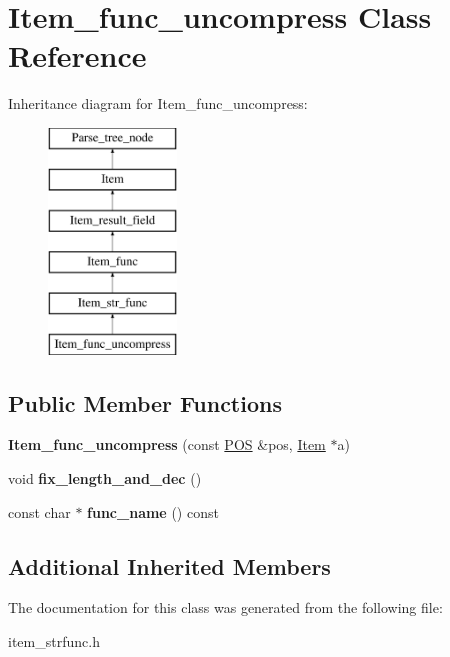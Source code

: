 \hypertarget{classItem__func__uncompress}{}\section{Item\+\_\+func\+\_\+uncompress Class Reference}
\label{classItem__func__uncompress}
Inheritance diagram for Item\+\_\+func\+\_\+uncompress\+:\begin{figure}[H]
\begin{center}
\leavevmode
\includegraphics[height=6.000000cm]{classItem__func__uncompress}
\end{center}
\end{figure}
\subsection*{Public Member Functions}
\begin{DoxyCompactItemize}
\item 
\mbox{\label{classItem__func__uncompress_ac390fd9a856f94caabbd4b89ed117a78}} 
{\bfseries Item\+\_\+func\+\_\+uncompress} (const \mbox{\hyperlink{structYYLTYPE}{P\+OS}} \&pos, \mbox{\hyperlink{classItem}{Item}} $\ast$a)
\item 
\mbox{\label{classItem__func__uncompress_aebe090ad85df923f4aacd6019c599284}} 
void {\bfseries fix\+\_\+length\+\_\+and\+\_\+dec} ()
\item 
\mbox{\label{classItem__func__uncompress_a11878828f9a55e01b967a1aa5c0193ef}} 
const char $\ast$ {\bfseries func\+\_\+name} () const
\end{DoxyCompactItemize}
\subsection*{Additional Inherited Members}


The documentation for this class was generated from the following file\+:\begin{DoxyCompactItemize}
\item 
item\+\_\+strfunc.\+h\end{DoxyCompactItemize}
